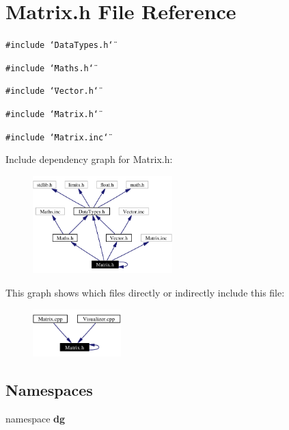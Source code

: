 \section{Matrix.h File Reference}
\label{Matrix_8h}
{\tt \#include \char`\"{}Data\-Types.h\char`\"{}}\par
{\tt \#include \char`\"{}Maths.h\char`\"{}}\par
{\tt \#include \char`\"{}Vector.h\char`\"{}}\par
{\tt \#include \char`\"{}Matrix.h\char`\"{}}\par
{\tt \#include \char`\"{}Matrix.inc\char`\"{}}\par


Include dependency graph for Matrix.h:\begin{figure}[H]
\begin{center}
\leavevmode
\includegraphics[width=153pt]{Matrix_8h__incl}
\end{center}
\end{figure}


This graph shows which files directly or indirectly include this file:\begin{figure}[H]
\begin{center}
\leavevmode
\includegraphics[width=97pt]{Matrix_8h__dep__incl}
\end{center}
\end{figure}
\subsection*{Namespaces}
\begin{CompactItemize}
\item 
namespace {\bf dg}
\end{CompactItemize}
